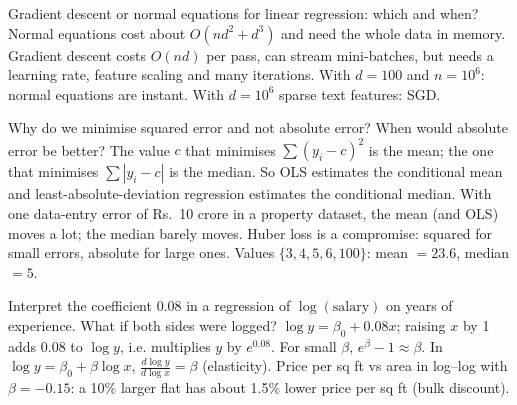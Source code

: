 \begin{qa}{Gradient descent or normal equations for linear regression: which and when?}
\why Normal equations cost about $O(nd^2 + d^3)$ and need the whole data in memory. Gradient descent costs
$O(nd)$ per pass, can stream mini-batches, but needs a learning rate, feature scaling and many iterations.
With $d = 100$ and $n = 10^6$: normal equations are instant. With $d = 10^6$ sparse text features: SGD.
\end{qa}

\begin{qa}{\deep Why do we minimise squared error and not absolute error? When would absolute error be better?}
\why The value $c$ that minimises $\sum(y_i - c)^2$ is the mean; the one that minimises $\sum|y_i - c|$ is the
median. So OLS estimates the conditional mean and least-absolute-deviation regression estimates the conditional
median. With one data-entry error of Rs.~10 crore in a property dataset, the mean (and OLS) moves a lot; the median
barely moves. Huber loss is a compromise: squared for small errors, absolute for large ones.
\worked Values $\{3, 4, 5, 6, 100\}$: mean $= 23.6$, median $= 5$.
\end{qa}

\begin{qa}{Interpret the coefficient $0.08$ in a regression of $\log(\text{salary})$ on years of experience.
What if both sides were logged?}
\why $\log y = \beta_0 + 0.08x$; raising $x$ by 1 adds 0.08 to $\log y$, i.e. multiplies $y$ by $e^{0.08}$. For small
$\beta$, $e^\beta - 1 \approx \beta$. In $\log y = \beta_0 + \beta\log x$, $\frac{d\log y}{d\log x} = \beta$ (elasticity).
\worked Price per sq ft vs area in log--log with $\beta = -0.15$: a 10\% larger flat has about 1.5\% lower price per
sq ft (bulk discount).
\end{qa}


